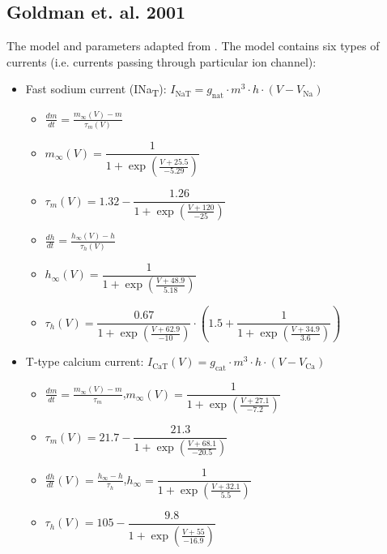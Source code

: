 \documentclass[../main.tex]{subfiles}
\begin{document}
\FloatBarrier

\newpage
\subsection{Goldman et. al. 2001}

The model and parameters adapted from \parencite{franciRobustTunableBursting2018}.
The model contains six types of currents (i.e. currents passing through particular ion channel):
\begin{itemize}

    \item Fast sodium current (INa\textsubscript{T}): 
    $I_{\text{NaT}} = g_{\text{nat}} \cdot m^3 \cdot h \cdot (V - V_{\text{Na}})$
    \begin{itemize}[label=\textopenbullet]
        \item $\frac{dm}{dt} = \frac{m_\infty(V) - m}{\tau_m(V)}$
        \item $m_\infty(V) = \dfrac{1}{1 + \exp\left(\frac{V + 25.5}{-5.29}\right)}$
        \item $\tau_m(V) = 1.32 - \dfrac{1.26}{1 + \exp\left(\frac{V + 120}{-25}\right)}$
        \item $\frac{dh}{dt} = \frac{h_\infty(V) - h}{\tau_h(V)}$
        \item $h_\infty(V) = \dfrac{1}{1 + \exp\left(\frac{V + 48.9}{5.18}\right)}$
        \item $\tau_h(V) = \dfrac{0.67}{1 + \exp\left(\frac{V + 62.9}{-10}\right)} \cdot \left(1.5 + \dfrac{1}{1 + \exp\left(\frac{V + 34.9}{3.6}\right)}\right)$
    \end{itemize}

    \item T-type calcium current:
    $I_{\text{CaT}}(V) = g_{\text{cat}} \cdot m^3 \cdot h \cdot (V - V_{\text{Ca}})$
    \begin{itemize}[label=\textopenbullet]
        \item $\frac{dm}{dt} = \frac{m_\infty(V) - m}{\tau_m}$,\quad $m_\infty(V) = \dfrac{1}{1 + \exp\left(\frac{V + 27.1}{-7.2}\right)}$
        \item $\tau_m(V) = 21.7 - \dfrac{21.3}{1 + \exp\left(\frac{V + 68.1}{-20.5}\right)}$
        \item $\frac{dh}{dt}(V) = \frac{h_\infty - h}{\tau_h}$,\quad $h_\infty = \dfrac{1}{1 + \exp\left(\frac{V + 32.1}{5.5}\right)}$
        \item $\tau_h(V) = 105 - \dfrac{9.8}{1 + \exp\left(\frac{V + 55}{-16.9}\right)}$
    \end{itemize}


\end{itemize}
\end{document}
